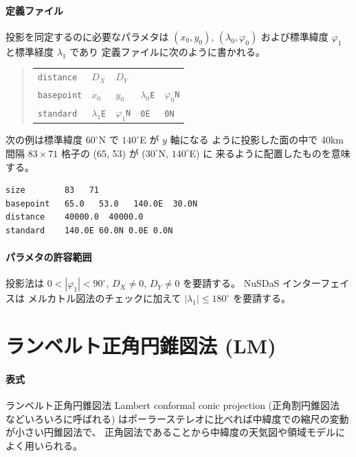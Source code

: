 \paragraph{定義ファイル}
投影を同定するのに必要なパラメタは
\((x_0, y_0)\),
\((\lambda_0, \varphi_0)\)
および標準緯度 \(\varphi_1\) と標準経度 \(\lambda_1\) であり
定義ファイルに次のように書かれる。
\begin{quote}
\begin{tabular}{lllll}
{\tt distance}	& $D_X$ & $D_Y$ & & \\
{\tt basepoint}	& $x_0$ & $y_0$	& $\lambda_0${\tt E} & $\varphi_0${\tt N} \\
{\tt standard}	& $\lambda_1${\tt E} & $\varphi_1${\tt N} & {\tt 0E} & {\tt 0N} \\
\end{tabular}
\end{quote}
次の例は標準緯度 $60^\circ$N で $140^\circ$E が $y$ 軸になる
ように投影した面の中で
40km 間隔 $83\times 71$ 格子の (65, 53) が ($30^\circ$N, $140^\circ$E) に
来るように配置したものを意味する。
\begin{screen}
\begin{verbatim}
size        83   71
basepoint   65.0   53.0   140.0E  30.0N
distance    40000.0  40000.0
standard    140.0E 60.0N 0.0E 0.0N
\end{verbatim}
\end{screen}

\paragraph{パラメタの許容範囲}
投影法は
\(0 < |\varphi_1| < 90^\circ\),
\(D_X \ne 0\),
\(D_Y \ne 0\)
を要請する。
NuSDaS インターフェイスは
メルカトル図法のチェックに加えて
\(|\lambda_1| \le 180^\circ\)
を要請する。

\section{ランベルト正角円錐図法 (LM)}

\paragraph{表式}
ランベルト正角円錐図法 Lambert conformal conic projection 
(正角割円錐図法 などいろいろに呼ばれる)
はポーラーステレオに比べれば中緯度での縮尺の変動が小さい円錐図法で、
正角図法であることから中緯度の天気図や領域モデルによく用いられる。

